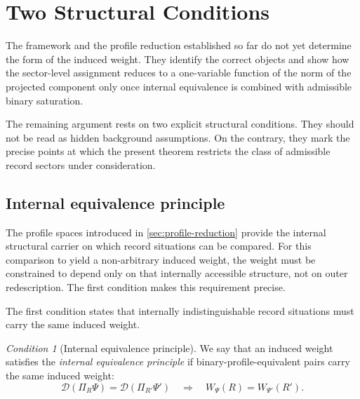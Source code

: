 \documentclass[11pt]{article}
\theoremstyle{remark}
\newtheorem{condition}[theorem]{Condition}
\numberwithin{equation}{section}
\newcommand{\Wpsi}[1]{W_{\Psi}\!\left(#1\right)}
\newcommand{\Proj}[1]{\Pi_{#1}}
\begin{document}
\section{Two Structural Conditions}
\label{sec:structural-conditions}

The framework and the profile reduction established so far do not yet determine the form of the induced weight. They identify the correct objects and show how the sector-level assignment reduces to a one-variable function of the norm of the projected component only once internal equivalence is combined with admissible binary saturation.

The remaining argument rests on two explicit structural conditions. They should not be read as hidden background assumptions. On the contrary, they mark the precise points at which the present theorem restricts the class of admissible record sectors under consideration.

\subsection{Internal equivalence principle}

The profile spaces introduced in \cref{sec:profile-reduction} provide
the internal structural carrier on which record situations can be
compared. For this comparison to yield a non-arbitrary induced weight,
the weight must be constrained to depend only on that internally
accessible structure, not on outer redescription. The first condition
makes this requirement precise.

The first condition states that internally indistinguishable record situations must carry the same induced weight.

\begin{condition}[Internal equivalence principle]
\label{cond:internal-equivalence}
We say that an induced weight satisfies the \emph{internal equivalence
principle} if binary-profile-equivalent pairs carry the same induced
weight:
\[
\mathcal{D}(\Proj{R}\Psi) = \mathcal{D}(\Proj{R'}\Psi')
\quad \Longrightarrow \quad
\Wpsi{R} = W_{\Psi'}\!\left(R'\right).
\]
\end{condition}
\end{document}
